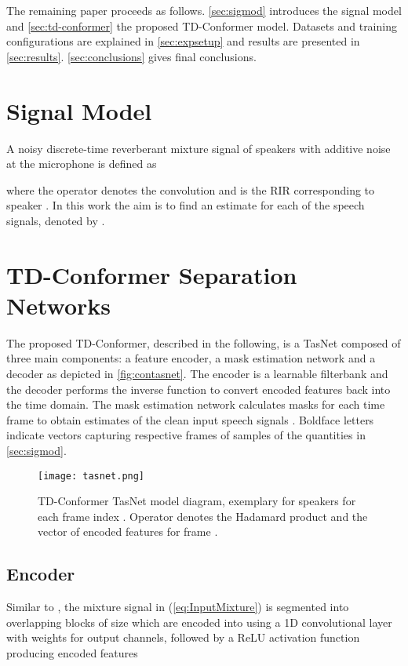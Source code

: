 The remaining paper proceeds as follows. \autoref{sec:sigmod} introduces the signal model and \autoref{sec:td-conformer} the proposed \ac{TD-Conformer} model. Datasets and training configurations are explained in \autoref{sec:expsetup} and results are presented in \autoref{sec:results}. \autoref{sec:conclusions} gives final conclusions.

\section{Signal Model}\label{sec:sigmod}
A noisy discrete-time reverberant mixture signal  of  speakers  with additive noise  at the microphone is defined as

where the operator  denotes the convolution and  is the \ac{RIR} corresponding to speaker . In this work the aim is to find an estimate for each of the  speech signals, denoted by .

\section{TD-Conformer Separation Networks} \label{sec:td-conformer}
The proposed \ac{TD-Conformer}, described in the following, is a \ac{TasNet} composed of three main components: a feature encoder, a mask estimation network and a decoder as depicted in \autoref{fig:contasnet}. The encoder is a learnable filterbank \cite{tasnet, Ditter} and the decoder performs the inverse function to convert encoded features back into the time domain. The mask estimation network calculates  masks  for each time frame  to obtain estimates  of the clean input speech signals . Boldface letters indicate vectors capturing respective frames of samples of the quantities in \autoref{sec:sigmod}.
\begin{figure}[!h]
    \centering
    \texttt{[image: tasnet.png]}
    \caption{\Ac{TD-Conformer} \ac{TasNet} model diagram, exemplary for  speakers for each frame index . Operator  denotes the Hadamard product and  the vector of encoded features for frame .}
    \label{fig:contasnet}
\end{figure}

\subsection{Encoder}
Similar to \cite{sepformer, convtasnet}, the mixture signal  in (\ref{eq:InputMixture}) is segmented into  overlapping blocks  of size  which are encoded into  using a 1D convolutional layer with weights  for  output channels, followed by a \ac{ReLU} activation function  producing encoded features


